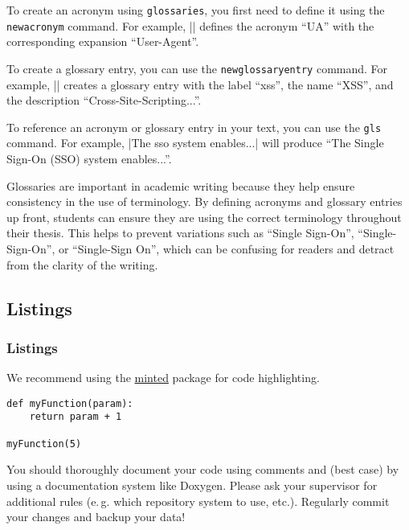 To create an acronym using \texttt{glossaries}, you first need to define it using the \texttt{newacronym} command. For example, \code|| defines the acronym \enquote{UA} with the corresponding expansion \enquote{User-Agent}.

To create a glossary entry, you can use the \texttt{newglossaryentry} command. For example, \code|| creates a glossary entry with the label \enquote{xss}, the name \enquote{XSS}, and the description \enquote{Cross-Site-Scripting...}.

To reference an acronym or glossary entry in your text, you can use the \texttt{gls} command. For example, \code|The \gls{sso} system enables...| will produce \enquote{The Single Sign-On (SSO) system enables...}.

Glossaries are important in academic writing because they help ensure consistency in the use of terminology. 
By defining acronyms and glossary entries up front, students can ensure they are using the correct terminology throughout their thesis. This helps to prevent variations such as \enquote{Single Sign-On}, \enquote{Single-Sign-On}, or \enquote{Single-Sign On}, which can be confusing for readers and detract from the clarity of the writing.

\subsection{Listings}

\subsubsection{Listings}

We recommend using the \href{https://de.overleaf.com/learn/latex/Code_Highlighting_with_minted}{minted} package for code highlighting.

\begin{verbatim}
def myFunction(param):
	return param + 1

myFunction(5)
\end{verbatim}

You should thoroughly document your code using comments and (best case) by using a documentation system like Doxygen. Please ask your supervisor for additional rules (e.\,g. which repository system to use, etc.). Regularly commit your changes and backup your data!
